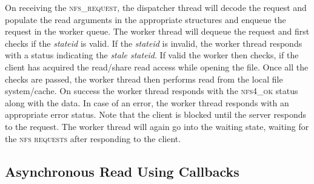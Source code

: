 On receiving the \textsc{nfs\_request}, the dispatcher thread will decode the request and populate the read arguments in the appropriate structures and enqueue the request in the worker queue. The worker thread will dequeue the request and first checks if the \textit{stateid} is valid. If the \textit{stateid} is invalid, the worker thread responds with a status indicating the \textit{stale stateid}. If valid the worker then checks, if the client has acquired the read/share read access while opening the file. Once all the checks are passed, the worker thread then performs read from the local file system/cache. On success the worker thread responds with the \textsc{nfs4\_ok} status along with the data. In case of an error, the worker thread responds with an appropriate error status. Note that the client is blocked until the server responds to the request. The worker thread will again go into the waiting state, waiting for the \textsc{nfs requests} after responding to the client.


\subsection{Asynchronous Read Using Callbacks}

